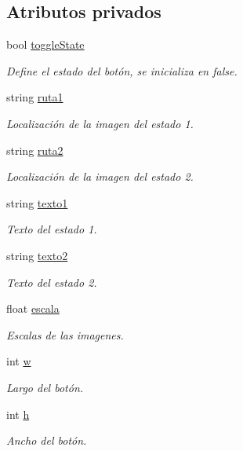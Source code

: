 \subsection*{Atributos privados}
\begin{DoxyCompactItemize}
\item 
bool \hyperlink{classboton_toggle_a16e1fc2e8c6b3bfc76f1de28f9623740}{toggle\+State}
\begin{DoxyCompactList}\small\item\em Define el estado del botón, se inicializa en false. \end{DoxyCompactList}\item 
string \hyperlink{classboton_toggle_acd9a4699cc7fcb3facda61450bafa25f}{ruta1}
\begin{DoxyCompactList}\small\item\em Localización de la imagen del estado 1. \end{DoxyCompactList}\item 
string \hyperlink{classboton_toggle_a29e4c1705e45c20f62a77176b7b2ae2d}{ruta2}
\begin{DoxyCompactList}\small\item\em Localización de la imagen del estado 2. \end{DoxyCompactList}\item 
string \hyperlink{classboton_toggle_abd3f33fb266429ad6697518506bedce8}{texto1}
\begin{DoxyCompactList}\small\item\em Texto del estado 1. \end{DoxyCompactList}\item 
string \hyperlink{classboton_toggle_a838680f64548815ecac688f7bd3cb59c}{texto2}
\begin{DoxyCompactList}\small\item\em Texto del estado 2. \end{DoxyCompactList}\item 
float \hyperlink{classboton_toggle_aec530290e05f262e49cd41ea80914bfb}{escala}
\begin{DoxyCompactList}\small\item\em Escalas de las imagenes. \end{DoxyCompactList}\item 
int \hyperlink{classboton_toggle_aa76dc9adf8e8b4513bf839a061ce2129}{w}
\begin{DoxyCompactList}\small\item\em Largo del botón. \end{DoxyCompactList}\item 
int \hyperlink{classboton_toggle_a1e88ceaf2b11a3f376f1bed5751bcbe2}{h}
\begin{DoxyCompactList}\small\item\em Ancho del botón. \end{DoxyCompactList}\end{DoxyCompactItemize}
